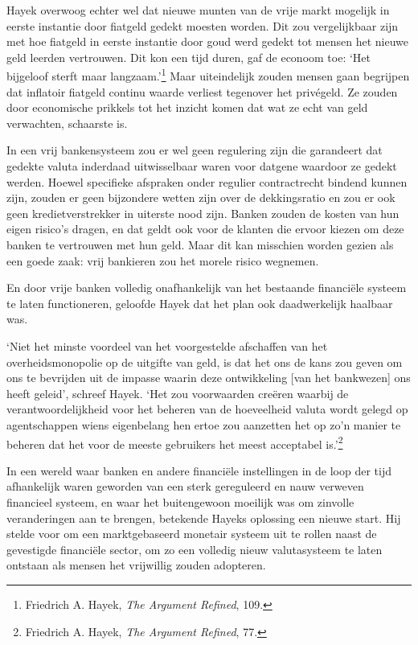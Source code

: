 \documentclass[
  a5paper,
  smalldemyvopaper,11pt,twoside,onecolumn,openright,extrafontsizes,
hidelinks]{memoir}
\begin{document}
Hayek overwoog echter wel dat nieuwe munten van de vrije markt mogelijk
in eerste instantie door fiatgeld gedekt moesten worden. Dit zou
vergelijkbaar zijn met hoe fiatgeld in eerste instantie door goud werd
gedekt tot mensen het nieuwe geld leerden vertrouwen. Dit kon een tijd
duren, gaf de econoom toe: `Het bijgeloof sterft maar
langzaam.'\footnote{Friedrich A. Hayek, \emph{The Argument Refined},
  109.} Maar uiteindelijk zouden mensen gaan begrijpen dat inflatoir
fiatgeld continu waarde verliest tegenover het privégeld. Ze zouden door
economische prikkels tot het inzicht komen dat wat ze echt van geld
verwachten, schaarste is.

In een vrij bankensysteem zou er wel geen regulering zijn die garandeert
dat gedekte valuta inderdaad uitwisselbaar waren voor datgene waardoor
ze gedekt werden. Hoewel specifieke afspraken onder regulier
contractrecht bindend kunnen zijn, zouden er geen bijzondere wetten zijn
over de dekkingsratio en zou er ook geen kredietverstrekker in uiterste
nood zijn. Banken zouden de kosten van hun eigen risico's dragen, en dat
geldt ook voor de klanten die ervoor kiezen om deze banken te vertrouwen
met hun geld. Maar dit kan misschien worden gezien als een goede zaak:
vrij bankieren zou het morele risico wegnemen.

En door vrije banken volledig onafhankelijk van het bestaande financiële
systeem te laten functioneren, geloofde Hayek dat het plan ook
daadwerkelijk haalbaar was.

`Niet het minste voordeel van het voorgestelde afschaffen van het
overheidsmonopolie op de uitgifte van geld, is dat het ons de kans zou
geven om ons te bevrijden uit de impasse waarin deze ontwikkeling {[}van
het bankwezen{]} ons heeft geleid', schreef Hayek. `Het zou voorwaarden
creëren waarbij de verantwoordelijkheid voor het beheren van de
hoeveelheid valuta wordt gelegd op agentschappen wiens eigenbelang hen
ertoe zou aanzetten het op zo'n manier te beheren dat het voor de meeste
gebruikers het meest acceptabel is.'\footnote{Friedrich A. Hayek,
  \emph{The Argument Refined}, 77.}

In een wereld waar banken en andere financiële instellingen in de loop
der tijd afhankelijk waren geworden van een sterk gereguleerd en nauw
verweven financieel systeem, en waar het buitengewoon moeilijk was om
zinvolle veranderingen aan te brengen, betekende Hayeks oplossing een
nieuwe start. Hij stelde voor om een marktgebaseerd monetair systeem uit
te rollen naast de gevestigde financiële sector, om zo een volledig
nieuw valutasysteem te laten ontstaan als mensen het vrijwillig zouden
adopteren.
\end{document}
